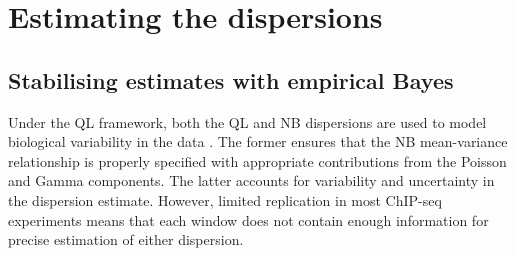 \documentclass{report}\usepackage[]{graphicx}\usepackage[usenames,dvipsnames]{color}
\newcommand{\hlnum}[1]{\textcolor[rgb]{0.816,0.125,0.439}{#1}}%
\newcommand{\hlstr}[1]{\textcolor[rgb]{0.251,0.627,0.251}{#1}}%
\newcommand{\hlopt}[1]{\textcolor[rgb]{0,0,0}{#1}}%
\newcommand{\hlstd}[1]{\textcolor[rgb]{0.251,0.251,0.251}{#1}}%
\newcommand{\hlkwb}[1]{\textcolor[rgb]{0,0,0}{#1}}%
\newcommand{\hlkwd}[1]{\textcolor[rgb]{0.878,0.439,0.125}{#1}}%
\newenvironment{knitrout}{}{} %
\begin{document}
\begin{knitrout}
\color{fgcolor}
\end{knitrout}

\section{Estimating the dispersions}

\subsection{Stabilising estimates with empirical Bayes}
\label{sec:dispest}
Under the QL framework, both the QL and NB dispersions are used to model biological variability in the data \cite{lund2012}. 
The former ensures that the NB mean-variance relationship is properly specified with appropriate contributions from the Poisson and Gamma components. 
The latter accounts for variability and uncertainty in the dispersion estimate. 
However, limited replication in most ChIP-seq experiments means that each window does not contain enough information for precise estimation of either dispersion. 
\end{document}
